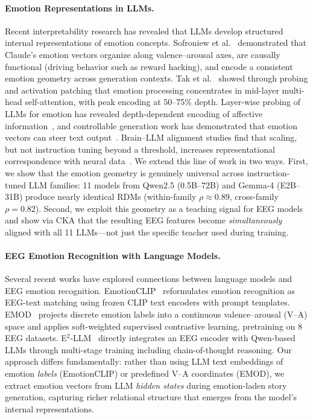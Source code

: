 \paragraph{Emotion Representations in LLMs.}
Recent interpretability research has revealed that LLMs develop structured internal representations of emotion concepts. Sofroniew et al.~\cite{sofroniew2026anthropic} demonstrated that Claude's emotion vectors organize along valence--arousal axes, are causally functional (driving behavior such as reward hacking), and encode a consistent emotion geometry across generation contexts. Tak et al.~\cite{tak2025emotion_interpretability} showed through probing and activation patching that emotion processing concentrates in mid-layer multi-head self-attention, with peak encoding at 50--75\% depth. Layer-wise probing of LLMs for emotion has revealed depth-dependent encoding of affective information~\cite{decoding_emotion_deep2024}, and controllable generation work has demonstrated that emotion vectors can steer text output~\cite{emotion_vectors_controllable2025}. Brain--LLM alignment studies find that scaling, but not instruction tuning beyond a threshold, increases representational correspondence with neural data~\cite{scaling_brain_alignment2024}. We extend this line of work in two ways. First, we show that the emotion geometry is genuinely universal across instruction-tuned LLM families: 11 models from Qwen2.5 (0.5B--72B) and Gemma-4 (E2B--31B) produce nearly identical RDMs (within-family $\rho \approx 0.89$, cross-family $\rho = 0.82$). Second, we exploit this geometry as a teaching signal for EEG models and show via CKA that the resulting EEG features become \emph{simultaneously} aligned with all 11 LLMs---not just the specific teacher used during training.

\paragraph{EEG Emotion Recognition with Language Models.}
Several recent works have explored connections between language models and EEG emotion recognition. EmotionCLIP~\cite{emotionclip2025} reformulates emotion recognition as EEG-text matching using frozen CLIP text encoders with prompt templates. EMOD~\cite{emod2026} projects discrete emotion labels into a continuous valence--arousal (V--A) space and applies soft-weighted supervised contrastive learning, pretraining on 8 EEG datasets. E$^2$-LLM~\cite{ma2026e2llm} directly integrates an EEG encoder with Qwen-based LLMs through multi-stage training including chain-of-thought reasoning. Our approach differs fundamentally: rather than using LLM text embeddings of emotion \emph{labels} (EmotionCLIP) or predefined V--A coordinates (EMOD), we extract emotion vectors from LLM \emph{hidden states} during emotion-laden story generation, capturing richer relational structure that emerges from the model's internal representations.

